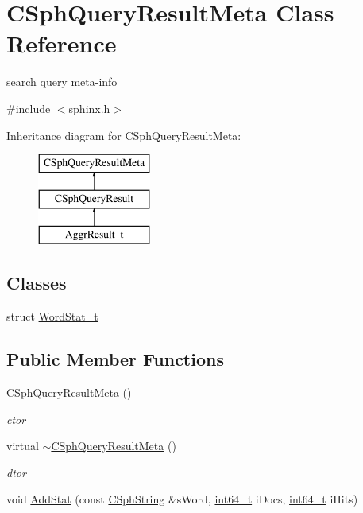 \hypertarget{classCSphQueryResultMeta}{\section{C\-Sph\-Query\-Result\-Meta Class Reference}
\label{classCSphQueryResultMeta}
}


search query meta-\/info  




{\ttfamily \#include $<$sphinx.\-h$>$}

Inheritance diagram for C\-Sph\-Query\-Result\-Meta\-:\begin{figure}[H]
\begin{center}
\leavevmode
\includegraphics[height=3.000000cm]{classCSphQueryResultMeta}
\end{center}
\end{figure}
\subsection*{Classes}
\begin{DoxyCompactItemize}
\item 
struct \hyperlink{structCSphQueryResultMeta_1_1WordStat__t}{Word\-Stat\-\_\-t}
\end{DoxyCompactItemize}
\subsection*{Public Member Functions}
\begin{DoxyCompactItemize}
\item 
\hyperlink{classCSphQueryResultMeta_a33eed84000f71dd203a9196eff989f88}{C\-Sph\-Query\-Result\-Meta} ()
\begin{DoxyCompactList}\small\item\em ctor \end{DoxyCompactList}\item 
virtual \hyperlink{classCSphQueryResultMeta_ace409540750a5b17177d99e68cba1722}{$\sim$\-C\-Sph\-Query\-Result\-Meta} ()
\begin{DoxyCompactList}\small\item\em dtor \end{DoxyCompactList}\item 
void \hyperlink{classCSphQueryResultMeta_a41095a8fa9bfc08860a5c83224b6f82c}{Add\-Stat} (const \hyperlink{structCSphString}{C\-Sph\-String} \&s\-Word, \hyperlink{sphinxstd_8h_a996e72f71b11a5bb8b3b7b6936b1516d}{int64\-\_\-t} i\-Docs, \hyperlink{sphinxstd_8h_a996e72f71b11a5bb8b3b7b6936b1516d}{int64\-\_\-t} i\-Hits)
\end{DoxyCompactItemize}
